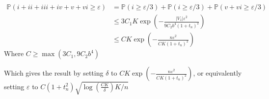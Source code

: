 \documentclass[12pt]{article}
\newcommand{\pr}{{\mathbb P}}
\begin{document}
\begin{itemize}
  \begin{align*}
    \pr( i + ii + iii + iv + v + vi \ge \varepsilon)
    &= \pr( i \ge \varepsilon/ 3) + \pr( i \ge \varepsilon / 3) + \pr(v + vi \ge \varepsilon /3)
    \\&\le 3 C_1 K \exp(-\frac{|V_1| \varepsilon^2}{9 C_2 b^4(1+t_n)^2})
    \\&\le C K \exp(-\frac{n\varepsilon^2}{CK (1+t_n)^2})
  \end{align*}
  Where $C \ge \max(3C_1, 9C_2b^4)$

  Which gives the result by setting $\delta$ to $C K \exp(-\frac{n\varepsilon^2}{CK (1+t_n)^2})$, or equivalently setting $\varepsilon$ to $C(1+t_n^2) \sqrt{\log (\frac{CK}{\delta}) K/ n}$
  
\end{itemize}
\end{document}
